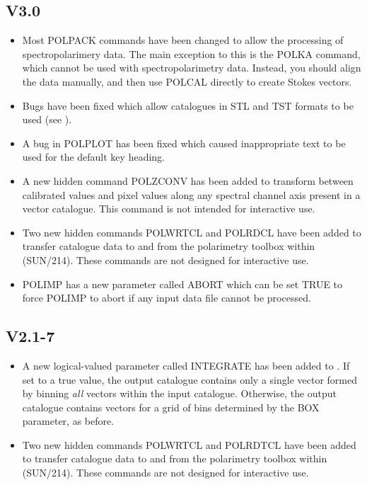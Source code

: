 \documentclass[twoside,11pt]{starlink}
\begin{document}
\subsection{V3.0}

\begin{itemize}
\item Most POLPACK commands have been changed to allow the processing of
spectropolarimery data. The main exception to this is the POLKA command,
which cannot be used with spectropolarimetry data. Instead, you should
align the data manually, and then use POLCAL directly to create Stokes
vectors.

\item Bugs have been fixed which allow catalogues in STL and TST formats
to be used (see ).

\item A bug in POLPLOT has been fixed which caused inappropriate
text to be used for the default key heading.

\item A new hidden command POLZCONV has been added to transform between
calibrated values and pixel values along any spectral channel axis
present in a vector catalogue. This command is not intended for
interactive use.

\item Two new hidden commands POLWRTCL and POLRDCL have been added to
transfer catalogue data to and from the polarimetry toolbox within
 (SUN/214). These commands are not
designed for interactive use.

\item POLIMP has a new parameter called ABORT which can be set TRUE
to force POLIMP to abort if any input data file cannot be processed.

\end{itemize}

\subsection{V2.1-7}
\begin{itemize}

\item A new logical-valued parameter called INTEGRATE has been added to
. If set to a true value, the output catalogue
contains only a single vector formed by binning \emph{all} vectors
within the input catalogue. Otherwise, the output catalogue contains
vectors for a grid of bins determined by the BOX parameter, as before.

\item Two new hidden commands POLWRTCL and POLRDTCL have been added to
transfer catalogue data to and from the polarimetry toolbox within
 (SUN/214). These commands are not
designed for interactive use.
\end{itemize}
\end{document}
